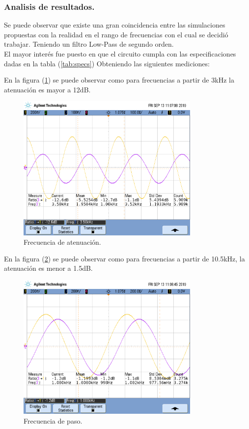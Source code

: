 \subsubsection{Analisis de resultados.}
Se puede observar que existe una gran coincidencia entre las simulaciones propuestas con la realidad en el rango de frecuencias con el cual se decidió trabajar. Teniendo un filtro Low-Pass de segundo orden.\\
El mayor interés fue puesto en que el circuito cumpla con las especificaciones dadas en la tabla (\ref{tab:specs})
Obteniendo las siguientes mediciones:


En la figura (\ref{fig:falp}) se puede observar como para frecuencias a partir de 3kHz la atenuación es mayor a 12dB.
\begin{figure}[H]	
	\centering
	\includegraphics[width=0.8\textwidth, trim = {0 3.35cm 0 2cm},clip]{ImagenesEj2/MedicionesGrilla/fa_lp.png}
	\caption{Frecuencia de atenuación.}
	\label{fig:falp}
\end{figure}

En la figura (\ref{fig:fplp}) se puede observar como para frecuencias a partir de 10.5kHz, la atenuación es menor a 1.5dB.

\begin{figure}[H]	
	\centering
	\includegraphics[width=0.8\textwidth, trim = {0 3.35cm 0 2cm},clip]{ImagenesEj2/MedicionesGrilla/fp_lp.png}
	\caption{Frecuencia de paso.}
	\label{fig:fplp}
\end{figure}
\newpage
